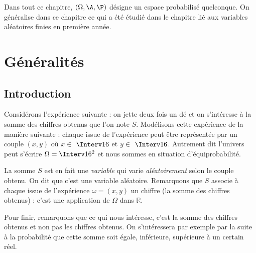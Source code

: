 \documentclass[a4paper,10pt]{report}
\begin{document}

\noindent Dans tout ce chapitre, $(\Omega, \A, \P)$ désigne un espace probabilisé quelconque. On généralise dans ce chapitre ce qui a été étudié dans le chapitre lié aux variables aléatoires finies en première année.


\section{Généralités}
\subsection{Introduction}

\noindent Considérons l'expérience suivante : on jette deux fois un dé et on s'intéresse à la somme des chiffres obtenus que l'on note $S$. Modélisons cette expérience de la manière suivante : chaque issue de l'expérience peut être représentée par un couple $(x,y)$ où $x \in$ $\Interv16$ et $y  \in$ $\Interv16$. Autrement dit l'univers peut s'écrire $\Omega = \Interv16^2$ et nous sommes en situation d'équiprobabilité.
%
%

\vspace{0.2cm}

\noindent La somme $S$ est en fait une \og \textit{variable} \fg  qui varie \textit{aléatoirement} selon le couple obtenu. On dit que c'est une variable aléatoire. Remarquons que $S$ associe à chaque issue de l'expérience $\omega=(x,y)$ un chiffre (la somme des chiffres obtenus) : c'est une application de $\Omega$ dans $\mathbb{R}$.

\vspace{0.2cm}

\noindent Pour finir, remarquons que ce qui nous intéresse, c'est la somme des chiffres obtenus et non pas les chiffres obtenus. On s'intéressera par exemple par la suite à la probabilité que cette somme soit égale, inférieure, supérieure à un certain réel.
\end{document}
